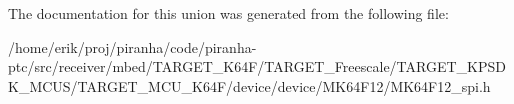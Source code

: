 The documentation for this union was generated from the following file\+:\begin{DoxyCompactItemize}
\item 
/home/erik/proj/piranha/code/piranha-\/ptc/src/receiver/mbed/\+T\+A\+R\+G\+E\+T\+\_\+\+K64\+F/\+T\+A\+R\+G\+E\+T\+\_\+\+Freescale/\+T\+A\+R\+G\+E\+T\+\_\+\+K\+P\+S\+D\+K\+\_\+\+M\+C\+U\+S/\+T\+A\+R\+G\+E\+T\+\_\+\+M\+C\+U\+\_\+\+K64\+F/device/device/\+M\+K64\+F12/M\+K64\+F12\+\_\+spi.\+h\end{DoxyCompactItemize}
